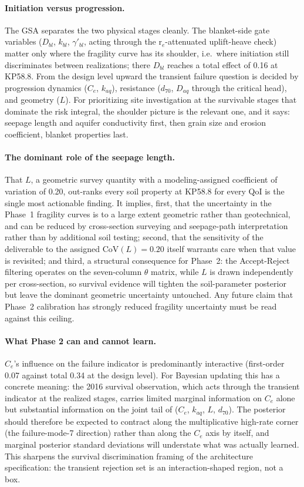 \paragraph{Initiation versus progression.}
The GSA separates the two physical stages cleanly. The blanket-side gate
variables ($D_{bl}$, $k_{bl}$, $\gamma'_{bl}$, acting through the
r$_e$-attenuated uplift-heave check) matter only where the fragility curve
has its shoulder, i.e.\ where initiation still discriminates between
realizations; there $D_{bl}$ reaches a total effect of 0.16 at KP58.8.
From the design level upward the transient failure question is decided by
progression dynamics ($C_e$, $k_{aq}$), resistance ($d_{70}$, $D_{aq}$
through the critical head), and geometry ($L$). For prioritizing site
investigation at the survivable stages that dominate the risk integral,
the shoulder picture is the relevant one, and it says: seepage length and
aquifer conductivity first, then grain size and erosion coefficient,
blanket properties last.

\paragraph{The dominant role of the seepage length.}
That $L$, a geometric survey quantity with a modeling-assigned coefficient
of variation of 0.20, out-ranks every soil property at KP58.8 for every QoI
is the single most actionable finding. It implies, first, that the
uncertainty in the Phase~1 fragility curves is to a large extent geometric
rather than geotechnical, and can be reduced by cross-section surveying
and seepage-path interpretation rather than by additional soil testing;
second, that the sensitivity of the deliverable to the assigned
$\mathrm{CoV}(L) = 0.20$ itself warrants care when that value is revisited;
and third, a structural consequence for Phase~2: the Accept-Reject
filtering operates on the seven-column $\theta$ matrix, while $L$ is drawn
independently per cross-section, so survival evidence will tighten the
soil-parameter posterior but leave the dominant geometric uncertainty
untouched. Any future claim that Phase~2 calibration has strongly reduced
fragility uncertainty must be read against this ceiling.

\paragraph{What Phase 2 can and cannot learn.}
$C_e$'s influence on the failure indicator is predominantly interactive
(first-order 0.07 against total 0.34 at the design level). For Bayesian
updating this has a concrete meaning: the 2016 survival observation, which
acts through the transient indicator at the realized stages, carries
limited marginal information on $C_e$ alone but substantial information on
the joint tail of ($C_e$, $k_{aq}$, $L$, $d_{70}$). The posterior should
therefore be expected to contract along the multiplicative
high-rate corner (the failure-mode-7 direction) rather than along the
$C_e$ axis by itself, and marginal posterior standard deviations will
understate what was actually learned. This sharpens the survival
discrimination framing of the architecture specification: the transient
rejection set is an interaction-shaped region, not a box.

